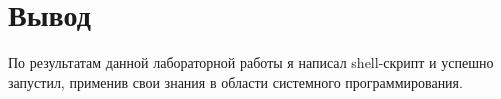 \section{Вывод}
По результатам данной лабораторной работы я написал shell-скрипт и успешно запустил, применив свои знания в области системного программирования.

